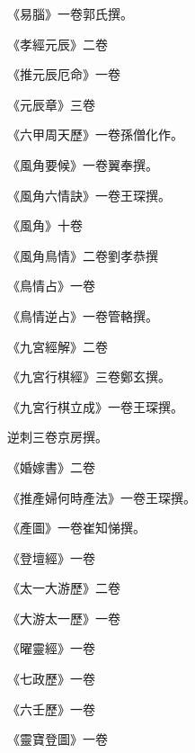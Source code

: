 \begin{pinyinscope}
 《易腦》一卷郭氏撰。



 《孝經元辰》二卷



 《推元辰厄命》一卷



 《元辰章》三卷



 《六甲周天歷》一卷孫僧化作。



 《風角要候》一卷翼奉撰。



 《風角六情訣》一卷王琛撰。



 《風角》十卷



 《風角鳥情》二卷劉孝恭撰



 《鳥情占》一卷



 《鳥情逆占》一卷管輅撰。



 《九宮經解》二卷



 《九宮行棋經》三卷鄭玄撰。



 《九宮行棋立成》一卷王琛撰。



 逆刺三卷京房撰。



 《婚嫁書》二卷



 《推產婦何時產法》一卷王琛撰。



 《產圖》一卷崔知悌撰。



 《登壇經》一卷



 《太一大游歷》二卷



 《大游太一歷》一卷



 《曜靈經》一卷



 《七政歷》一卷



 《六壬歷》一卷



 《靈寶登圖》一卷




\end{pinyinscope}
